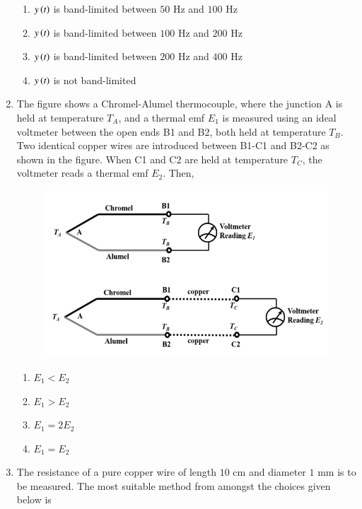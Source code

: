 \documentclass[journal,12pt,onecolumn]{IEEEtran}
\theoremstyle{remark}
\begin{document}
\begin{enumerate}
\hfill{}
\begin{enumerate}
\item $y\left(t\right)$ is band-limited between $50$ Hz and $100$ Hz
\item $y\left(t\right)$ is band-limited between $100$ Hz and $200$ Hz
\item $y\left(t\right)$ is band-limited between $200$ Hz and $400$ Hz
\item $y\left(t\right)$ is not band-limited
\end{enumerate}

\item The figure shows a Chromel-Alumel thermocouple, where the junction A is held at temperature $T_A$, and a thermal emf $E_1$ is measured using an ideal voltmeter between the open ends B1 and B2, both held at temperature $T_B$. Two identical copper wires are introduced between B1-C1 and B2-C2 as shown in the figure. When C1 and C2 are held at temperature $T_C$, the voltmeter reads a thermal emf $E_2$. Then, \underline{\hspace{2cm}}

\hfill{}
\begin{figure}[H]
\includegraphics[width = 0.75\columnwidth]{q19}
\caption*{}
\label{q19}
\end{figure}
\begin{enumerate}
\item $E_1 < E_2$
\item $E_1 > E_2$
\item $E_1 = 2E_2$
\item $E_1 = E_2$
\end{enumerate}

\item The resistance of a pure copper wire of length $10$ cm and diameter $1$ mm is to be measured. The most suitable method from amongst the choices given below is \underline{\hspace{2cm}}


\end{enumerate}
\end{document}
